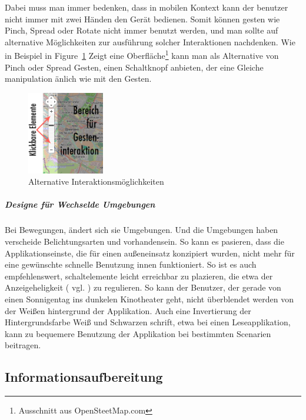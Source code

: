 Dabei muss man immer bedenken, dass in mobilen Kontext kann der benutzer nicht immer mit zwei Händen den Gerät bedienen. Somit können gesten wie Pinch, Spread oder Rotate nicht immer benutzt werden, und man sollte auf alternative Möglichkeiten zur ausführung solcher Interaktionen nachdenken. Wie in Beispiel in Figure~\ref{fig:nuibsp} Zeigt eine Oberfläche\footnote{Ausschnitt aus OpenSteetMap.com} kann man als Alternative von Pinch oder Spread Gesten, einen Schaltknopf anbieten, der eine Gleiche manipulation änlich wie mit den Gesten.

\begin{figure}
	\begin{center}
	
	\includegraphics[width=0.3\textwidth]{img/NUIbsp.png}
	\caption{Alternative Interaktionsmöglichkeiten}\label{fig:nuibsp}
\end{center}
\end{figure}

\subparagraph{Designe für Wechselde Umgebungen} %
\label{subp:designe_f_r_au_eneinsatz}

Bei Bewegungen, ändert sich sie Umgebungen. Und die Umgebungen haben verscheide Belichtungsarten und vorhandensein. So kann es pasieren, dass die Applikationseinste, die für einen außeneinsatz konzipiert wurden, nicht mehr für eine gewünschte schnelle Benutzung innen funktioniert. So ist es auch empfehlenswert, schaltelemente leicht erreichbar zu plazieren, die etwa der Anzeigeheligkeit ( vgl. \cite[ff Seite 418]{mobileInteraces}) zu regulieren. So kann der Benutzer, der gerade von einen Sonnigentag ins dunkelen Kinotheater geht, nicht überblendet werden von der Weißen hintergrund der Applikation. Auch eine Invertierung der Hintergrundsfarbe Weiß und Schwarzen schrift, etwa bei einen Leseapplikation, kann zu bequemere Benutzung der Applikation bei bestimmten Scenarien beitragen.

\subsection{Informationsaufbereitung}
\label{sec:Informationsaufbereitung}

